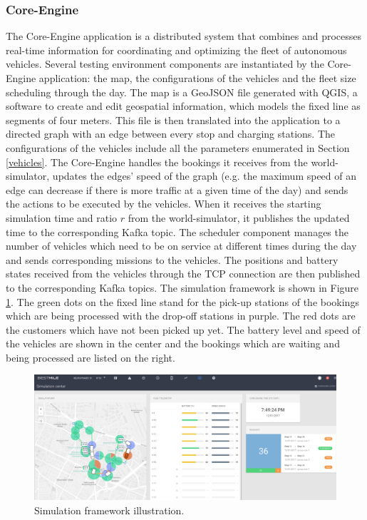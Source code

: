 \documentclass[12pt,a4paper]{article}
\begin{document}
\subsubsection{Core-Engine}
The Core-Engine application is a distributed system that combines and processes real-time information for coordinating and optimizing the fleet of autonomous vehicles. Several testing environment components are instantiated by the Core-Engine application: the map, the configurations of the vehicles and the fleet size scheduling through the day. The map is a GeoJSON file generated with QGIS, a software to create and edit geospatial information, which models the fixed line as segments of four meters. This file is then translated into the application to a directed graph with an edge between every stop and charging stations. The configurations of the vehicles include all the parameters enumerated in Section \ref{vehicles}. The Core-Engine handles the bookings it receives from the world-simulator, updates the edges' speed of the graph (e.g. the maximum speed of an edge can decrease if there is more traffic at a given time of the day) and sends the actions to be executed by the vehicles. When it receives the starting simulation time and ratio $r$ from the world-simulator, it publishes the updated time to the corresponding Kafka topic. The scheduler component manages the number of vehicles which need to be on service at different times during the day and sends corresponding missions to the vehicles. The positions and battery states received from the vehicles through the TCP connection are then published to the corresponding Kafka topics. The simulation framework is shown in Figure \ref{fig:simu}. The green dots on the fixed line stand for the pick-up stations of the bookings which are being processed with the drop-off stations in purple. The red dots are the customers which have not been picked up yet. The battery level and speed of the vehicles are shown in the center and the bookings which are waiting and being processed are listed on the right.

\begin{figure} 
  \centering
\includegraphics[width=\textwidth]{./images/coreengine.pdf}
\caption{Simulation framework illustration.}
\label{fig:simu}
\end{figure}
\end{document}
